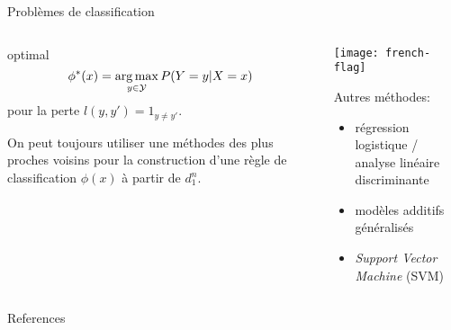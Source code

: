 \documentclass[unknownkeysallowed]{beamer}
\begin{document}
\begin{frame}{Problèmes de classification}
    \begin{columns}
   \begin{column}[T]{.48\textwidth}
       optimal
      \begin{equation*}
          \phi^*(x) = \mathop{\mathrm{arg\,max}}_{y\in \mathcal{Y}} P(Y=y|X=x)
      \end{equation*}
      pour la perte  $l(y,y')=1_{y\neq y'}$.

      \vspace{1cm}

      On peut toujours utiliser une méthodes
      des plus proches voisins pour la construction d'une règle de classification  $\widehat{\phi}(x)$ à partir de $d_1^n$.

   \end{column}
    \begin{column}[T]{.48\textwidth}
    \centering
      \texttt{[image: french-flag]}

      \vspace{1cm}

      Autres méthodes:
      \begin{itemize}
      \item régression logistique / analyse linéaire discriminante
      \item modèles additifs généralisés
      \item \emph{Support Vector Machine} (SVM)
      \end{itemize}
      \vspace{1cm}



    \end{column}
  \end{columns}
\end{frame}



\begin{frame}{References}
\printbibliography
\end{frame}
\end{document}
